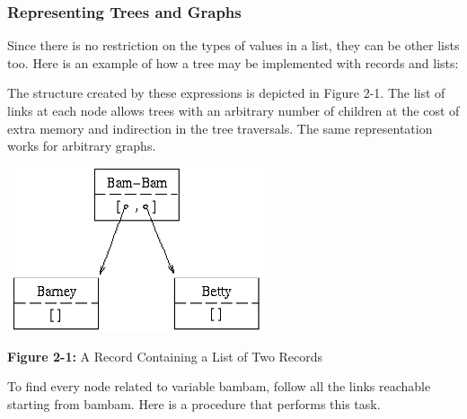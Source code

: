 \subsubsection{Representing Trees and Graphs}

Since there is no restriction on the types of values in a list, they can
be other lists too. Here is an example of how a tree may be implemented
with records and lists:


The structure created by these expressions is depicted in Figure 2-1.
The list of links at each node allows trees with an arbitrary number of
children at the cost of extra memory and indirection in the tree
traversals. The same representation works for arbitrary
graphs.



\begin{center}
\includegraphics[width=3in,height=1.9in]{ub-img/ub-img6.png}
\end{center}

{\sffamily\bfseries Figure 2-1:}
{\sffamily A Record Containing a List of Two Records}

\bigskip

To find every node related to variable \textsf{bambam}, follow all the
links reachable starting from \textsf{bambam}. Here is a procedure that
performs this task.


